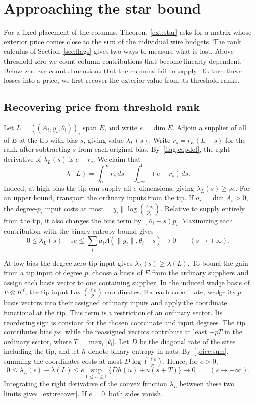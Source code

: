 \section{Approaching the star bound}\label{sec:achieve}

For a fixed placement of the columns, Theorem~\ref{ext:star} asks for a
matrix whose exterior price comes close to the sum of the individual wire
budgets. The rank calculus of Section~\ref{sec:flags} gives two ways to
measure what is lost. Above threshold zero we count column contributions
that become linearly dependent. Below zero we count dimensions that the
columns fail to supply. To turn these losses into a price, we first
recover the exterior value from its threshold ranks.

\subsection{Recovering price from threshold rank}

Let $L=((A_i,y_i,\theta_i))_i$ span $E$, and write $e=\dim E$.
Adjoin a supplier of all of $E$ at the tip with bias $s$, giving value
$\lambda_L(s)$. Write $r_s=r_E(L-s)$ for the rank after subtracting
$s$ from each original bias. By~\eqref{flag:capdef}, the right derivative of
$\lambda_L(s)$ is $e-r_s$. We claim that
\begin{equation}\label{ext:recover}
 \lambda(L)=\int_0^\infty r_s\,ds
             -\int_{-\infty}^0(e-r_s)\,ds .
\end{equation}
Indeed, at high bias the tip can supply all $e$ dimensions, giving
$\lambda_L(s)\ge se$. For an upper bound, transport the ordinary
inputs from the tip. If $a_i=\dim A_i>0$, the degree-$p_i$ input costs
at most $\|y_i\|\log\binom{\ell a_i}{p_i}$. Relative to supply entirely
from the tip, it also changes the bias term by $(\theta_i-s)p_i$.
Maximizing each contribution with the binary entropy bound gives
\[
 0\le\lambda_L(s)-se\le
 \sum_i a_i A(\|y_i\|,\theta_i-s)\longrightarrow0
 \qquad (s\to+\infty).
\]

At low bias the degree-zero tip input gives
$\lambda_L(s)\ge\lambda(L)$. To bound the gain from a tip input of
degree $p$, choose a basis of $E$ from the ordinary suppliers and
assign each basis vector to one containing supplier. In the induced
wedge basis of $E\otimes K^\ell$, the tip input has
$\binom{\ell e}{p}$ coordinates. For each coordinate, wedge its $p$
basis vectors into their assigned ordinary inputs and apply the
coordinate functional at the tip. This term is a restriction of an
ordinary sector. Its reordering sign is constant for the chosen
coordinate and input degrees. The tip contributes bias $ps$, while the
reassigned vectors contribute at least $-pT$ in the ordinary sector,
where $T=\max_i|\theta_i|$. Let $D$ be the diagonal rate of the sites
including the tip, and let $h$ denote binary entropy in nats.
By~\eqref{price:sum}, summing the coordinates costs at most
$D\log\binom{\ell e}{p}$. Hence, for $e>0$,
\[
 0\le\lambda_L(s)-\lambda(L)\le
 e\sup_{0\le u\le1}\{D h(u)+u(s+T)\}
 \longrightarrow0\qquad (s\to-\infty).
\]
Integrating the right derivative of the convex function $\lambda_L$
between these two limits gives~\eqref{ext:recover}. If $e=0$, both
sides vanish.

